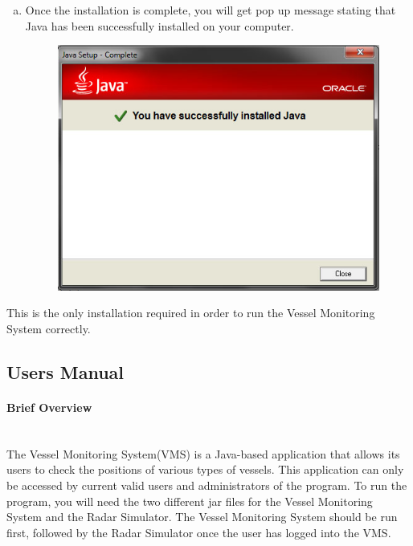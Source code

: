 \documentclass{article}
\begin{document}
\begin{enumerate}[(a)]
\begin{figure}[!htb]
	\end{figure}
  \item Once the installation is complete, you will get pop up message stating that Java has been successfully installed on your computer.
	\begin{figure}[!htb]
	\centering
	\includegraphics[scale=0.6]{images/javaInstall3.jpg}
	\end{figure}
\end{enumerate}

This is the only installation required in order to run the Vessel Monitoring System correctly.
\clearpage

\subsection{Users Manual}
\paragraph{Brief Overview \\ \\}

The Vessel Monitoring System(VMS) is a Java-based application that allows its users to check the positions of various types of vessels. This application can only be accessed by current valid users and administrators of the program. To run the program, you will need the two different jar files for the Vessel Monitoring System and the Radar Simulator. The Vessel Monitoring System should be run first, followed by the Radar Simulator once the user has logged into the VMS.
\end{document}
